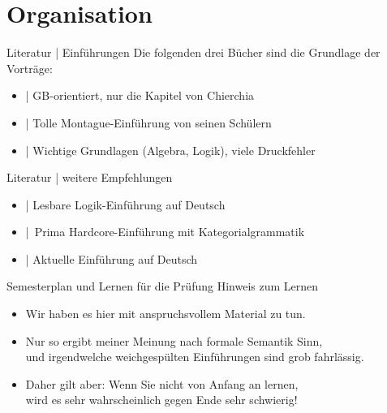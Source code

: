 
\section{Organisation}

\begin{frame}
  {Literatur | Einführungen}
  \onslide<+->
  \onslide<+->
  Die folgenden drei Bücher sind die Grundlage der Vorträge:\\
  \Zeile
  \begin{itemize}[<+->]
    \item \alert{\citet{ChierchiaMcconnellginet2000}} | GB-orientiert, nur die Kapitel von Chierchia
    \item \alert{\citet{DowtyEa1981}} | Tolle Montague-Einführung von seinen Schülern
    \item \alert{\citet{ParteeEa1990}} | Wichtige Grundlagen (Algebra, Logik), viele Druckfehler
  \end{itemize}
  \onslide<+->
  \centering 
  \large
  \Zeile
\end{frame}

\begin{frame}
  {Literatur | weitere Empfehlungen}
  \onslide<+->
  \begin{itemize}[<+->]
    \item \alert{\citet{Bucher1998}} | Lesbare Logik-Einführung auf Deutsch
    \item \alert{\citet{Carpenter1997}} | Prima Hardcore-Einführung mit Kategorialgrammatik
    \item \alert{\citet{Gutzmann2019}} | Aktuelle Einführung auf Deutsch
  \end{itemize}
\end{frame}


\begin{frame}
  {Semesterplan und Lernen für die Prüfung}
  \onslide<+->
  \onslide<+->
  \centering 
  \alert{\large Hinweis zum Lernen}\\
  \Halbzeile
  \begin{itemize}[<+->]
    \item Wir haben es hier mit anspruchsvollem Material zu tun.
    \item Nur so ergibt meiner Meinung nach formale Semantik Sinn,\\
      und irgendwelche weichgespülten Einführungen sind grob fahrlässig.
    \item Daher gilt aber: Wenn Sie nicht von Anfang an lernen,\\
      wird es sehr wahrscheinlich gegen Ende sehr schwierig!
  \end{itemize}
\end{frame}

